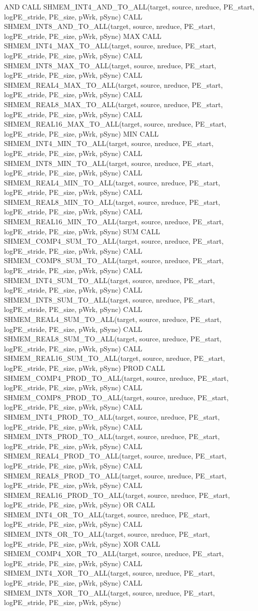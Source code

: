 AND
CALL SHMEM_INT4_AND_TO_ALL(target, source, nreduce, PE_start, logPE_stride, PE_size, pWrk, pSync)
CALL SHMEM_INT8_AND_TO_ALL(target, source, nreduce, PE_start, logPE_stride, PE_size, pWrk, pSync)
MAX
CALL SHMEM_INT4_MAX_TO_ALL(target, source, nreduce, PE_start, logPE_stride, PE_size, pWrk, pSync)
CALL SHMEM_INT8_MAX_TO_ALL(target, source,	 nreduce, PE_start, logPE_stride, PE_size, pWrk, pSync)
CALL SHMEM_REAL4_MAX_TO_ALL(target, source, nreduce, PE_start, logPE_stride, PE_size, pWrk, pSync)
CALL SHMEM_REAL8_MAX_TO_ALL(target,	source, nreduce, PE_start, logPE_stride, PE_size, pWrk, pSync)
CALL SHMEM_REAL16_MAX_TO_ALL(target, source, nreduce, PE_start, logPE_stride, PE_size, pWrk, pSync)
MIN
CALL SHMEM_INT4_MIN_TO_ALL(target, source, nreduce, PE_start, logPE_stride, PE_size, pWrk, pSync)
CALL SHMEM_INT8_MIN_TO_ALL(target, source, nreduce, PE_start, logPE_stride, PE_size, pWrk, pSync)
CALL SHMEM_REAL4_MIN_TO_ALL(target, source, nreduce, PE_start, logPE_stride, PE_size, pWrk, pSync)
CALL SHMEM_REAL8_MIN_TO_ALL(target, source, nreduce, PE_start, logPE_stride, PE_size, pWrk, pSync)
CALL SHMEM_REAL16_MIN_TO_ALL(target, source, nreduce, PE_start, logPE_stride, PE_size, pWrk, pSync)
SUM
CALL SHMEM_COMP4_SUM_TO_ALL(target,	 source, nreduce, PE_start, logPE_stride, PE_size, pWrk, pSync)
CALL SHMEM_COMP8_SUM_TO_ALL(target, source, nreduce, PE_start, logPE_stride, PE_size, pWrk, pSync)
CALL SHMEM_INT4_SUM_TO_ALL(target, source, nreduce, PE_start, logPE_stride, PE_size, pWrk, pSync)
CALL SHMEM_INT8_SUM_TO_ALL(target, source, nreduce, PE_start, logPE_stride, PE_size, pWrk, pSync)
CALL SHMEM_REAL4_SUM_TO_ALL(target, source, nreduce, PE_start, logPE_stride, PE_size, pWrk, pSync)
CALL SHMEM_REAL8_SUM_TO_ALL(target, source, nreduce, PE_start, logPE_stride, PE_size, pWrk, pSync)
CALL SHMEM_REAL16_SUM_TO_ALL(target, source, nreduce, PE_start, logPE_stride, PE_size, pWrk, pSync)
PROD
CALL SHMEM_COMP4_PROD_TO_ALL(target, source, nreduce, PE_start, logPE_stride, PE_size, pWrk, pSync)
CALL SHMEM_COMP8_PROD_TO_ALL(target, source, nreduce, PE_start, logPE_stride, PE_size, pWrk, pSync)
CALL SHMEM_INT4_PROD_TO_ALL(target, source, nreduce, PE_start, logPE_stride, PE_size, pWrk, pSync)
CALL SHMEM_INT8_PROD_TO_ALL(target, source, nreduce, PE_start, logPE_stride, PE_size, pWrk, pSync)
CALL SHMEM_REAL4_PROD_TO_ALL(target, source, nreduce, PE_start, logPE_stride, PE_size, pWrk, pSync)
CALL SHMEM_REAL8_PROD_TO_ALL(target, source, nreduce, PE_start, logPE_stride, PE_size, pWrk, pSync)
CALL SHMEM_REAL16_PROD_TO_ALL(target, source, nreduce, PE_start, logPE_stride, PE_size, pWrk, pSync)
OR
CALL SHMEM_INT4_OR_TO_ALL(target,	 source, nreduce, PE_start, logPE_stride, PE_size, pWrk, pSync)
CALL SHMEM_INT8_OR_TO_ALL(target,	source,	 nreduce, PE_start, logPE_stride, PE_size, pWrk, pSync)	
XOR
CALL SHMEM_COMP4_XOR_TO_ALL(target, source, nreduce, PE_start, logPE_stride, PE_size, pWrk, pSync)
CALL SHMEM_INT4_XOR_TO_ALL(target, source, nreduce, PE_start, logPE_stride, PE_size, pWrk, pSync)
CALL SHMEM_INT8_XOR_TO_ALL(target, source, nreduce, PE_start, logPE_stride, PE_size, pWrk, pSync)


